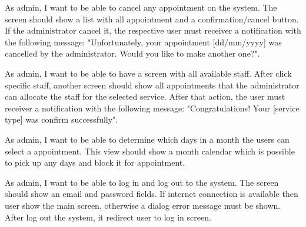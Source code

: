 \begin{description}[font=$\bullet$~\normalfont\scshape\color{red!50!black}]

\item [Cancel appointment] As admin, I want to be able to cancel any appointment on the system. The screen should show a list with all appointment and a confirmation/cancel button. If the administrator cancel it, the respective user must receiver a notification with the following message: "Unfortunately, your appointment [dd/mm/yyyy] was cancelled by the administrator. Would you like to make another one?".

\item [Allocate staff for a service]As admin, I want to be able to have a screen with all available staff. After click specific staff, another screen should show all appointments that the administrator can allocate the staff for the selected service.  After that action, the user must receiver a notification with the following message: "Congratulations! Your [service type] was confirm successfully".

\item [Workday]As admin, I want to be able to determine which days in a month the users can select a appointment. This view should show a month calendar which is possible to pick up any days and block it for appointment. 

\item [Log in] As admin, I want to be able to log in and log out to the system. The screen should  show an email and password fields. If internet connection is available then user show the main screen, otherwise a dialog error message must be shown. After log out the system, it redirect user to log in screen.

\end{description}